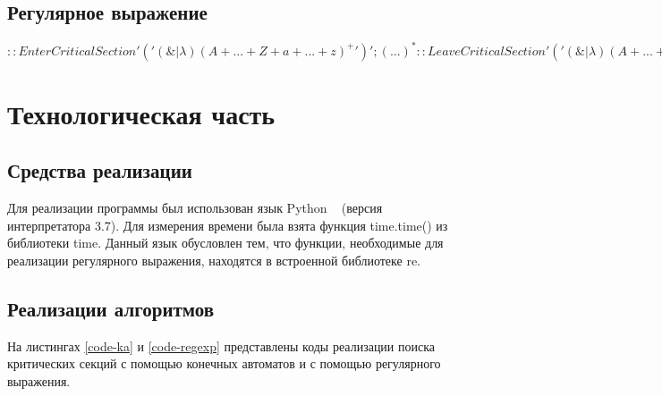 \documentclass[12pt, a4paper]{report}
\begin{document}
	\section{Регулярное выражение}
	$::EnterCriticalSection'(' (\&|\lambda) (A+...+Z+a+...+z)^{+} ')';(...)^*
	::LeaveCriticalSection'(' (\&|\lambda) (A+...+Z+a+...+z)^{+} ')';$

	\chapter{Технологическая часть}
	\section{Средства реализации}
	\hspace{0.5cm}Для реализации программы был использован язык Python ~\cite{py} (версия интерпретатора 3.7). Для измерения времени была взята функция time.time() из
	библиотеки time. Данный язык обусловлен тем, что функции, необходимые для реализации регулярного выражения, находятся в встроенной библиотеке re.
	
	\section{Реализации алгоритмов}
	На листингах \ref{code-ka} и \ref{code-regexp} представлены коды реализации поиска критических секций с помощью конечных автоматов и с помощью регулярного выражения.
	
	
\end{document}
